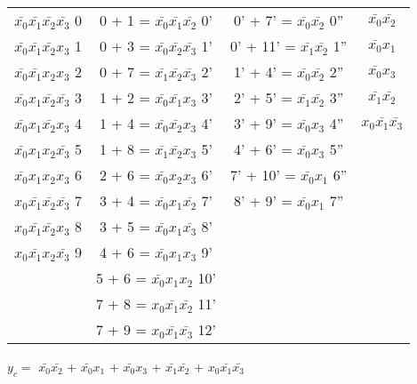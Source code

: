 \documentclass{bmstu}
\begin{document}
	\begin{center}
		\begin{tabular}{ |c|c|c|c| }   
		    \hline
		$\bar{x_0} \bar{x_1} \bar{x_2} \bar{x_3} $  0&0 + 1 = $\bar{x_0} \bar{x_1} \bar{x_2} $  0' &0' + 7' = $\bar{x_0} \bar{x_2} $  0'' &$\bar{x_0} \bar{x_2} $\\
		$\bar{x_0} \bar{x_1} \bar{x_2} x_3 $  1&0 + 3 = $\bar{x_0} \bar{x_2} \bar{x_3} $  1' &0' + 11' = $\bar{x_1} \bar{x_2} $  1'' &$\bar{x_0} x_1 $\\
		$\bar{x_0} \bar{x_1} x_2 x_3 $  2&0 + 7 = $\bar{x_1} \bar{x_2} \bar{x_3} $  2' &1' + 4' = $\bar{x_0} \bar{x_2} $  2'' &$\bar{x_0} x_3 $\\
		$\bar{x_0} x_1 \bar{x_2} \bar{x_3} $  3&1 + 2 = $\bar{x_0} \bar{x_1} x_3 $  3' &2' + 5' = $\bar{x_1} \bar{x_2} $  3'' &$\bar{x_1} \bar{x_2} $\\
		$\bar{x_0} x_1 \bar{x_2} x_3 $  4&1 + 4 = $\bar{x_0} \bar{x_2} x_3 $  4' &3' + 9' = $\bar{x_0} x_3 $  4'' &$x_0 \bar{x_1} \bar{x_3} $\\
		$\bar{x_0} x_1 x_2 \bar{x_3} $  5&1 + 8 = $\bar{x_1} \bar{x_2} x_3 $  5' &4' + 6' = $\bar{x_0} x_3 $  5'' &   \\
		$\bar{x_0} x_1 x_2 x_3 $  6&2 + 6 = $\bar{x_0} x_2 x_3 $  6' &7' + 10' = $\bar{x_0} x_1 $  6'' &   \\
		$x_0 \bar{x_1} \bar{x_2} \bar{x_3} $  7&3 + 4 = $\bar{x_0} x_1 \bar{x_2} $  7' &8' + 9' = $\bar{x_0} x_1 $  7'' &   \\
		$x_0 \bar{x_1} \bar{x_2} x_3 $  8&3 + 5 = $\bar{x_0} x_1 \bar{x_3} $  8' & &   \\
		$x_0 \bar{x_1} x_2 \bar{x_3} $  9&4 + 6 = $\bar{x_0} x_1 x_3 $  9' & &   \\
		&5 + 6 = $\bar{x_0} x_1 x_2 $ 10' & &   \\
		&7 + 8 = $x_0 \bar{x_1} \bar{x_2} $ 11' & &   \\
		&7 + 9 = $x_0 \bar{x_1} \bar{x_3} $ 12' & &   \\
			\hline
		\end{tabular}
	\end{center}
	$y_c =$ $\bar{x_0} \bar{x_2} $ + $\bar{x_0} x_1 $ + $\bar{x_0} x_3 $ + $\bar{x_1} \bar{x_2} $ + $x_0 \bar{x_1} \bar{x_3} $
\end{document}
